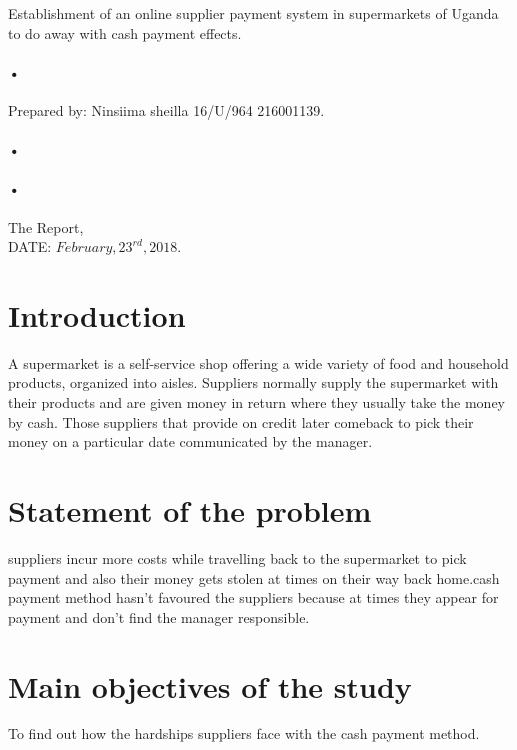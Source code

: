 \documentclass[12pt,]{article}
\begin{document}
\begin{titlepage}
\centerline{Establishment of an online supplier payment system in supermarkets of Uganda to do away with cash payment effects.\\}
\paragraph*{•}
\centerline{  Prepared by:  Ninsiima sheilla 16/U/964 216001139.\\}
\paragraph*{•}
\paragraph*{•}
  \begin{flushright}
  The Report,\\
  DATE: $February,23^{rd},2018$.
 \tableofcontents

  \end{flushright}
\date{\today}
\end{titlepage}

\newpage





\section{Introduction}
A supermarket is a self-service shop offering a wide variety of food and household products, organized into aisles.
Suppliers normally supply the supermarket with their products and are given money in return where they usually take the money by cash. Those suppliers that provide on credit later comeback to pick their money on a particular date communicated by the manager.


\section{Statement of the problem}
suppliers incur more costs while travelling back to the supermarket to pick payment and also their money gets stolen at times on their way back home.cash payment method hasn't favoured the suppliers because at times they appear for payment and don't find the manager responsible.
\section{Main objectives of the study}
To find out how the hardships suppliers face with the cash payment method.
\end{document}

